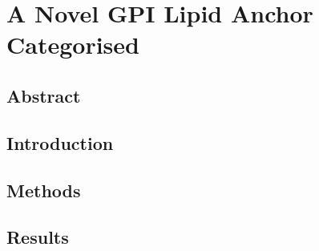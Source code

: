 
\chapter{A Novel GPI Lipid Anchor Categorised} %
\section{Abstract}
\section{Introduction}
\section{Methods}
\section{Results}
